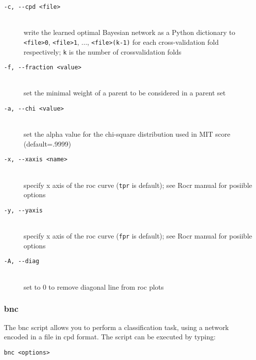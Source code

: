 \begin{description}
\item[\texttt{-c, -\hspace{0pt}-cpd <file>}]~\\
 write the learned optimal Bayesian network as a Python dictionary to \texttt{<file>0}, \texttt{<file>1}, ..., \texttt{<file>(k-1)}
 for each cross-validation fold respectively; \texttt{k} is the number of crossvalidation folds 
\item[\texttt{-f, -\hspace{0pt}-fraction <value>}]~\\
 set the minimal weight of a parent to be considered in a parent set
\item[\texttt{-a, -\hspace{0pt}-chi <value>}]~\\
 set the alpha value for the chi-square distribution used in MIT score (default=.9999)

\item[\texttt{-x, -\hspace{0pt}-xaxis <name>}]~\\
 specify x axis of the roc curve (\texttt{tpr} is default); see Rocr manual for posiible options
\item[\texttt{-y, -\hspace{0pt}-yaxis}]~\\
 specify x axis of the roc curve (\texttt{fpr} is default); see Rocr manual for posiible options
\item[\texttt{-A, -\hspace{0pt}-diag}]~\\
 set to 0 to remove diagonal line from roc plots
\end{description}

\subsubsection{bnc}

The bnc script allows you to perform a classification task, using a network encoded in a file in cpd format. The script can be executed by typing:
\begin{verbatim}
bnc <options>
\end{verbatim}

